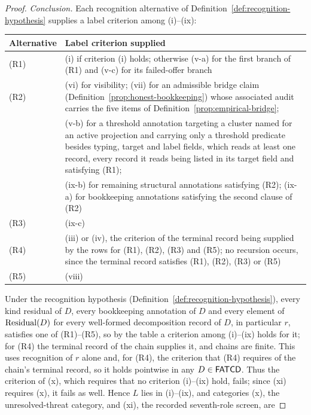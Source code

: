 \begin{proof}
\emph{Conclusion.} Each recognition alternative of
Definition~\ref{def:recognition-hypothesis} supplies a label criterion among
(i)--(ix):
\begin{center}
\small
\begin{tabularx}{\linewidth}{@{}l>{\raggedright\arraybackslash}X@{}}
\toprule
Alternative & Label criterion supplied \\
\midrule
(R1) & (i) if criterion (i) holds; otherwise (v-a) for the first branch of (R1) and (v-c) for its failed-offer branch \\
(R2) & (vi) for visibility; (vii) for an admissible bridge claim (Definition~\ref{prop:honest-bookkeeping}) whose associated audit carries the five items of Definition~\ref{prop:empirical-bridge}; \\
     & (v-b) for a threshold annotation targeting a cluster named for an active projection and carrying only a threshold predicate besides typing, target and label fields, which reads at least one record, every record it reads being listed in its target field and satisfying (R1); \\
     & (ix-b) for remaining structural annotations satisfying (R2); (ix-a) for bookkeeping annotations satisfying the second clause of (R2) \\
(R3) & (ix-c) \\
(R4) & (iii) or (iv), the criterion of the terminal record being supplied by the rows for (R1), (R2), (R3) and (R5); no recursion occurs, since the terminal record satisfies (R1), (R2), (R3) or (R5) \\
(R5) & (viii) \\
\bottomrule
\end{tabularx}
\end{center}
Under the recognition hypothesis
(Definition~\ref{def:recognition-hypothesis}), every kind residual of \(D\), every bookkeeping annotation of \(D\) and every element of \(\operatorname{Residual}\!\left(D\right)\) for every well-formed decomposition record of \(D\), in particular \(r\), satisfies one of (R1)--(R5), so by the table a criterion among (i)--(ix)
holds for it; for (R4) the terminal record of the chain supplies it, and
chains are finite. This uses recognition of \(r\) alone and, for (R4), the
criterion that (R4) requires of the chain's terminal record, so it holds
pointwise in any \(D\in\mathsf{FATCD}{}\). Thus the criterion of (x), which requires that no
criterion (i)--(ix) hold, fails; since (xi) requires (x), it fails as well.
Hence \(L\) lies in (i)--(ix), and categories (x), the
unresolved-threat category, and (xi), the recorded seventh-role screen, are

\end{proof}
